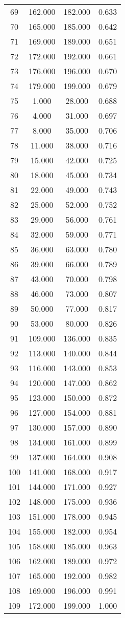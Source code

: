 \begin{tabular}{cccc}
  69 & 162.000 & 182.000 & 0.633 \\ 
  70 & 165.000 & 185.000 & 0.642 \\ 
  71 & 169.000 & 189.000 & 0.651 \\ 
  72 & 172.000 & 192.000 & 0.661 \\ 
  73 & 176.000 & 196.000 & 0.670 \\ 
  74 & 179.000 & 199.000 & 0.679 \\ 
  75 & 1.000 & 28.000 & 0.688 \\ 
  76 & 4.000 & 31.000 & 0.697 \\ 
  77 & 8.000 & 35.000 & 0.706 \\ 
  78 & 11.000 & 38.000 & 0.716 \\ 
  79 & 15.000 & 42.000 & 0.725 \\ 
  80 & 18.000 & 45.000 & 0.734 \\ 
  81 & 22.000 & 49.000 & 0.743 \\ 
  82 & 25.000 & 52.000 & 0.752 \\ 
  83 & 29.000 & 56.000 & 0.761 \\ 
  84 & 32.000 & 59.000 & 0.771 \\ 
  85 & 36.000 & 63.000 & 0.780 \\ 
  86 & 39.000 & 66.000 & 0.789 \\ 
  87 & 43.000 & 70.000 & 0.798 \\ 
  88 & 46.000 & 73.000 & 0.807 \\ 
  89 & 50.000 & 77.000 & 0.817 \\ 
  90 & 53.000 & 80.000 & 0.826 \\ 
  91 & 109.000 & 136.000 & 0.835 \\ 
  92 & 113.000 & 140.000 & 0.844 \\ 
  93 & 116.000 & 143.000 & 0.853 \\ 
  94 & 120.000 & 147.000 & 0.862 \\ 
  95 & 123.000 & 150.000 & 0.872 \\ 
  96 & 127.000 & 154.000 & 0.881 \\ 
  97 & 130.000 & 157.000 & 0.890 \\ 
  98 & 134.000 & 161.000 & 0.899 \\ 
  99 & 137.000 & 164.000 & 0.908 \\ 
  100 & 141.000 & 168.000 & 0.917 \\ 
  101 & 144.000 & 171.000 & 0.927 \\ 
  102 & 148.000 & 175.000 & 0.936 \\ 
  103 & 151.000 & 178.000 & 0.945 \\ 
  104 & 155.000 & 182.000 & 0.954 \\ 
  105 & 158.000 & 185.000 & 0.963 \\ 
  106 & 162.000 & 189.000 & 0.972 \\ 
  107 & 165.000 & 192.000 & 0.982 \\ 
  108 & 169.000 & 196.000 & 0.991 \\ 
  109 & 172.000 & 199.000 & 1.000 \\ 
   \hline
\end{tabular}
